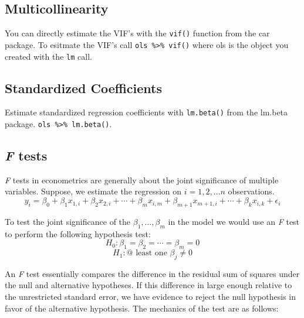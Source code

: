 \documentclass[]{book}
\begin{document}
\hypertarget{multicollinearity}{%
\subsection{Multicollinearity}\label{multicollinearity}}

You can directly estimate the VIF's with the \texttt{vif()} function from the car package. To esitmate the VIF's call \texttt{ols\ \%\textgreater{}\%\ vif()} where ols is the object you created with the \texttt{lm} call.

\hypertarget{standardized-coefficients}{%
\subsection{Standardized Coefficients}\label{standardized-coefficients}}

Estimate standardized regression coefficients with \texttt{lm.beta()} from the lm.beta package. \texttt{ols\ \%\textgreater{}\%\ lm.beta()}.

\hypertarget{f-tests}{%
\subsection{\texorpdfstring{\emph{F} tests}{F tests}}\label{f-tests}}

\emph{F} tests in econometrics are generally about the joint significance of multiple variables. Suppose, we estimate the regression on \(i=1,2,\ldots n\) observations. \[y_i=\beta_0+\beta_1x_{1,i}+\beta_2x_{2,i}+\cdots+\beta_mx_{i,m}+\beta_{m+1}x_{m+1,i}+\cdots+\beta_kx_{i,k} + \epsilon_i\]

To test the joint significance of the \(\beta_1,\ldots,\beta_m\) in the model we would use an \emph{F} test to perform the following hypothesis test: \[H_0: \beta_1=\beta_2=\cdots=\beta_m=0\] \[H_1:\text{@ least one }\beta_j\ne0\]

An \emph{F} test essentially compares the difference in the residual sum of squares under the null and alternative hypotheses. If this difference in large enough relative to the unrestricted standard error, we have evidence to reject the null hypothesis in favor of the alternative hypothesis. The mechanics of the test are as follows:
\end{document}
